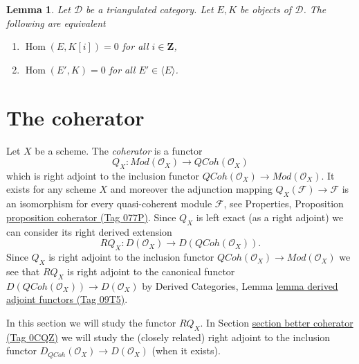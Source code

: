 \documentclass{amsart}
\theoremstyle{plain}
\newtheorem{lemma}[subsection]{Lemma}
\theoremstyle{definition}
\theoremstyle{remark}
\numberwithin{equation}{subsection}
\def\Hom{\mathop{\mathrm{Hom}}\nolimits}
\def\QCoh{\mathit{QCoh}}
\begin{document}
\begin{lemma}
\label{derived-lemma-right-orthogonal}
Let $\mathcal{D}$ be a triangulated category. Let $E, K$ be objects
of $\mathcal{D}$. The following are equivalent
\begin{enumerate}
\item $\Hom(E, K[i]) = 0$ for all $i \in \mathbf{Z}$,
\item $\Hom(E', K) = 0$ for all $E' \in \langle E \rangle$.
\end{enumerate}
\end{lemma}

\section{The coherator}
\label{section-coherator}

\noindent
Let $X$ be a scheme. The {\it coherator} is a functor
$$
Q_X :
\textit{Mod}(\mathcal{O}_X)
\longrightarrow
\QCoh(\mathcal{O}_X)
$$
which is right adjoint to the inclusion functor
$\QCoh(\mathcal{O}_X) \to \textit{Mod}(\mathcal{O}_X)$.
It exists for any scheme $X$ and moreover the adjunction mapping
$Q_X(\mathcal{F}) \to \mathcal{F}$ is an isomorphism for every
quasi-coherent module $\mathcal{F}$, see
Properties, Proposition \href{https://stacks.math.columbia.edu/tag/077P}{proposition coherator (Tag 077P)}.
Since $Q_X$ is left exact (as a right adjoint) we can consider its
right derived extension
$$
RQ_X :
D(\mathcal{O}_X)
\longrightarrow
D(\QCoh(\mathcal{O}_X)).
$$
Since $Q_X$ is right adjoint to the inclusion functor
$\QCoh(\mathcal{O}_X) \to \textit{Mod}(\mathcal{O}_X)$
we see that $RQ_X$ is right adjoint to the canonical functor
$D(\QCoh(\mathcal{O}_X)) \to D(\mathcal{O}_X)$ by
Derived Categories, Lemma \href{https://stacks.math.columbia.edu/tag/09T5}{lemma derived adjoint functors (Tag 09T5)}.

\medskip\noindent
In this section we will study the functor $RQ_X$. In
Section \href{https://stacks.math.columbia.edu/tag/0CQZ}{section better coherator (Tag 0CQZ)}
we will study the (closely related) right adjoint to the inclusion functor
$D_\QCoh(\mathcal{O}_X) \to D(\mathcal{O}_X)$ (when it exists).
\end{document}
